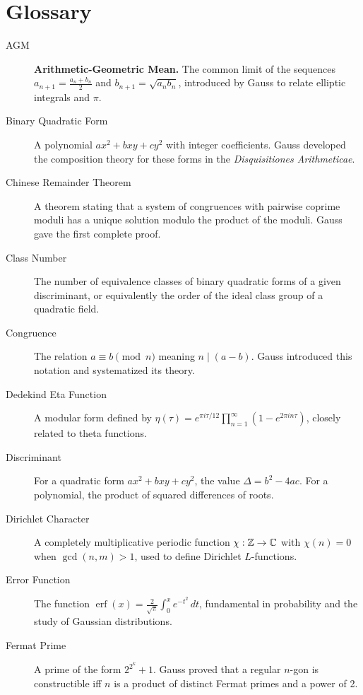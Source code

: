 \chapter{Glossary}
\label{ch:glossary}

\begin{description}
\item[AGM] \textbf{Arithmetic-Geometric Mean.} The common limit of the sequences $a_{n+1} = \frac{a_n+b_n}{2}$ and $b_{n+1} = \sqrt{a_n b_n}$, introduced by Gauss to relate elliptic integrals and $\pi$.

\item[Binary Quadratic Form] A polynomial $ax^2 + bxy + cy^2$ with integer coefficients. Gauss developed the composition theory for these forms in the \textit{Disquisitiones Arithmeticae}.

\item[Chinese Remainder Theorem] A theorem stating that a system of congruences with pairwise coprime moduli has a unique solution modulo the product of the moduli. Gauss gave the first complete proof.

\item[Class Number] The number of equivalence classes of binary quadratic forms of a given discriminant, or equivalently the order of the ideal class group of a quadratic field.

\item[Congruence] The relation $a \equiv b \pmod{n}$ meaning $n \mid (a-b)$. Gauss introduced this notation and systematized its theory.

\item[Dedekind Eta Function] A modular form defined by $\eta(\tau) = e^{\pi i \tau/12} \prod_{n=1}^{\infty}(1-e^{2\pi i n\tau})$, closely related to theta functions.

\item[Discriminant] For a quadratic form $ax^2+bxy+cy^2$, the value $\Delta = b^2-4ac$. For a polynomial, the product of squared differences of roots.

\item[Dirichlet Character] A completely multiplicative periodic function $\chi: \mathbb{Z} \to \mathbb{C}$ with $\chi(n) = 0$ when $\gcd(n,m) > 1$, used to define Dirichlet $L$-functions.

\item[Error Function] The function $\operatorname{erf}(x) = \frac{2}{\sqrt{\pi}}\int_0^x e^{-t^2}\,dt$, fundamental in probability and the study of Gaussian distributions.

\item[Fermat Prime] A prime of the form $2^{2^k}+1$. Gauss proved that a regular $n$-gon is constructible iff $n$ is a product of distinct Fermat primes and a power of 2.


\end{description}
